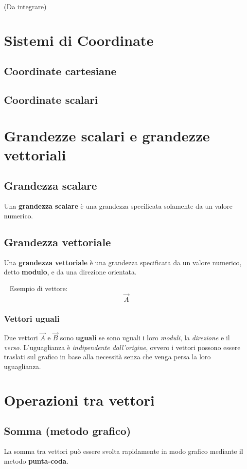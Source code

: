 \documentclass[12pt,oneside]{book}
\begin{document}
(Da integrare)

\section{Sistemi di Coordinate}
\subsection{Coordinate cartesiane}
\subsection{Coordinate scalari}

\section{Grandezze scalari e grandezze vettoriali}
\subsection{Grandezza scalare}
Una \textbf{grandezza scalare} è una grandezza specificata solamente da un valore numerico.

\subsection{Grandezza vettoriale}
Una \textbf{grandezza vettoriale} è una grandezza specificata da un valore numerico, detto \textbf{modulo}, e da una direzione orientata.

~\newline
Esempio di vettore:
\begin{equation*}
    \vec{A}
\end{equation*}

\subsubsection{Vettori uguali}
Due vettori $\vec{A}$ e $\vec{B}$ sono \textbf{uguali} se sono uguali i loro \emph{moduli}, la \emph{direzione} e il \emph{verso}.
L'uguaglianza è \emph{indipendente dall'origine}, ovvero i vettori possono essere traslati sul grafico in base alla necessità
senza che venga persa la loro uguaglianza.

\section{Operazioni tra vettori}
\subsection{Somma (metodo grafico)}
La somma tra vettori può essere svolta rapidamente in modo grafico mediante il metodo \textbf{punta-coda}.
\end{document}
